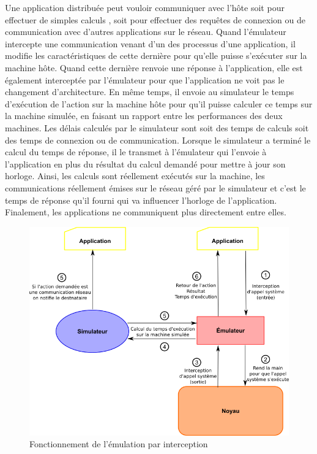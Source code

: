 Une application distribuée peut vouloir communiquer avec l'hôte soit pour
 effectuer de simples calculs %
 , soit pour effectuer des requêtes de
 connexion ou de communication avec d'autres applications sur le réseau. Quand
 l'émulateur intercepte une communication venant d'un des processus d'une
 application, il modifie les caractéristiques de cette dernière pour qu'elle
 puisse s'exécuter sur la machine hôte. Quand cette dernière renvoie une réponse
 à l'application, elle est également interceptée par l'émulateur pour que
 l'application ne voit pas le changement d'architecture. En même temps, il
 envoie au simulateur le temps d'exécution de l'action sur la machine hôte pour
 qu'il puisse calculer ce temps sur la machine simulée, en faisant un rapport
 entre les performances des deux machines. Les délais calculés par le simulateur
 sont soit des temps de calculs soit des temps de connexion ou de
 communication. Lorsque le simulateur a terminé le calcul du temps de réponse,
 il le transmet à l'émulateur qui l'envoie à l'application en plus du résultat
 du calcul demandé pour mettre à jour son horloge. Ainsi, les calculs sont
 réellement exécutés sur la machine, les communications réellement émises sur le
 réseau géré par le simulateur et c'est le temps de réponse qu'il fourni qui va
 influencer l'horloge de l'application. Finalement, les applications ne
 communiquent plus directement entre elles.

 \begin{figure}
   \centering
   \includegraphics[scale=0.5]{Pictures/png/Emulation_fonctionnement}
   \caption{Fonctionnement de l'émulation par interception}
   \label{INTERCEPTION}
 \end{figure}
 
